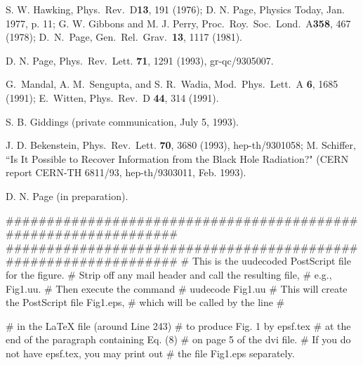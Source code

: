 \begin{thebibliography}{99}
 S. W. Hawking,  Phys.\ Rev.\ D{\bf 13}, 191 (1976);
D. N. Page, Physics Today, Jan. 1977, p. 11;
G. W. Gibbons and M. J. Perry, Proc.\ Roy.\ Soc.\ Lond.\ A{\bf 358},
467
(1978);
D.\ N.\ Page, Gen.\ Rel.\ Grav.\ {\bf 13}, 1117 (1981).

 D. N. Page, Phys.\ Rev.\ Lett. {\bf 71}, 1291
(1993),
gr-qc/9305007.

 G.~Mandal, A. M.~Sengupta, and S. R.~Wadia,
Mod.~Phys.~Lett.~A
{\bf 6}, 1685 (1991); E.~Witten, Phys.~Rev.~D {\bf  44}, 314 (1991).

 S. B. Giddings (private communication, July 5,
1993).

 J. D. Bekenstein, Phys.\ Rev.\ Lett. {\bf 70}, 3680
(1993),
hep-th/9301058;
M. Schiffer, ``Is It Possible to Recover Information
from the Black Hole Radiation?" (CERN report CERN-TH 6811/93,
hep-th/9303011, Feb. 1993).

 D. N. Page (in preparation).

	\end{thebibliography}



################################################################
################################################################
# This is the uudecoded PostScript file for the figure.
# Strip off any mail header and call the resulting file,
# e.g., Fig1.uu.
# Then execute the command
# uudecode Fig1.uu
# This will create the PostScript file Fig1.eps,
# which will be called by the line
# \centerline{}
# in the LaTeX file (around Line 243)
# to produce Fig. 1 by epsf.tex
# at the end of the paragraph containing Eq. (8)
# on page 5 of the dvi file.
# If you do not have epsf.tex, you may print out
# the file Fig1.eps separately.

